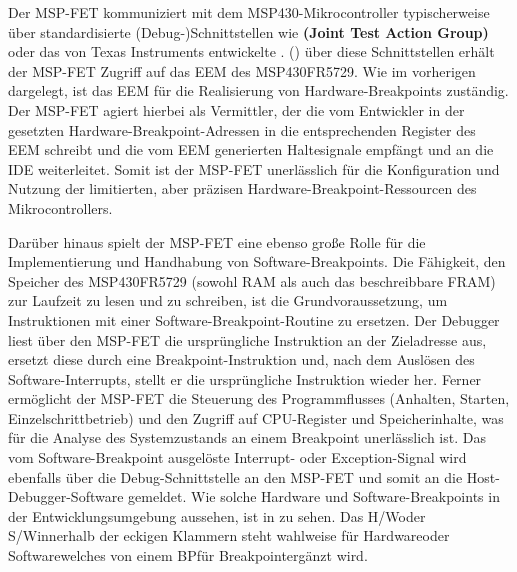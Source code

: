 Der MSP-FET kommuniziert mit dem MSP430-Mikrocontroller typischerweise \"uber standardisierte (Debug-)Schnittstellen wie \textbf{ (Joint Test Action Group)} oder das von Texas Instruments entwickelte . () \"uber diese Schnittstellen erh\"alt der MSP-FET Zugriff auf das EEM des MSP430FR5729. Wie im vorherigen  dargelegt, ist das EEM f\"ur die Realisierung von Hardware-Breakpoints zust\"andig. Der MSP-FET agiert hierbei als Vermittler, der die vom Entwickler in der  gesetzten Hardware-Breakpoint-Adressen in die entsprechenden Register des EEM schreibt und die vom EEM generierten Haltesignale empf\"angt und an die IDE weiterleitet. Somit ist der MSP-FET unerl\"asslich f\"ur die Konfiguration und Nutzung der limitierten, aber pr\"azisen Hardware-Breakpoint-Ressourcen des Mikrocontrollers. 

Dar\"uber hinaus spielt der MSP-FET eine ebenso gro{\ss}e Rolle f\"ur die Implementierung und Handhabung von Software-Breakpoints. Die F\"ahigkeit, den Speicher des MSP430FR5729 (sowohl RAM als auch das beschreibbare FRAM) zur Laufzeit zu lesen und zu schreiben, ist die Grundvoraussetzung, um Instruktionen mit einer Software-Breakpoint-Routine zu ersetzen. Der Debugger liest \"uber den MSP-FET die urspr\"ungliche Instruktion an der Zieladresse aus, ersetzt diese durch eine Breakpoint-Instruktion und, nach dem Ausl\"osen des Software-Interrupts, stellt er die urspr\"ungliche Instruktion wieder her. Ferner erm\"oglicht der MSP-FET die Steuerung des Programmflusses (Anhalten, Starten, Einzelschrittbetrieb) und den Zugriff auf CPU-Register und Speicherinhalte, was f\"ur die Analyse des Systemzustands an einem Breakpoint unerl\"asslich ist. Das vom Software-Breakpoint ausgel\"oste Interrupt- oder Exception-Signal wird ebenfalls \"uber die Debug-Schnittstelle an den MSP-FET und somit an die Host-Debugger-Software gemeldet. Wie solche Hardware und Software-Breakpoints in der Entwicklungsumgebung aussehen, ist in  zu sehen. Das \glqq H/W\grqq oder \glqq S/W\grqq innerhalb der eckigen Klammern steht wahlweise f\"ur \glqq Hardware\grqq oder \glqq Software\grqq welches von einem \glqq BP\grqq f\"ur \glqq Breakpoint\grqq erg\"anzt wird.


